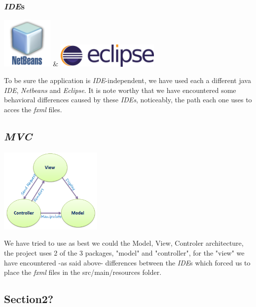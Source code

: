 \documentclass[11pt]{article}
\begin{document}
\subsubsection{\textit{IDE}s}
\begin{center}
\includegraphics[width=2.5cm]{./img/netBeans.png} \& \includegraphics[width=5cm]{./img/eclipse.png}
\end{center}
To be sure the application is \textit{IDE}-independent, we have used each a different java \textit{IDE}, \textit{Netbeans} and \textit{Eclipse}. It is note worthy that we have encountered some behavioral differences caused by these \textit{IDEs}, noticeably, the path each one uses to acces the \textit{fxml} files.
\subsection{\textit{MVC}}
\begin{center}
\includegraphics[width=5cm]{./img/mvc.png}
\end{center}
We have tried to use as best we could the Model, View, Controler architecture, the project uses 2 of the 3 packages, "model" and "controller", for the "view" we have encountered -as said above- differences between the \textit{IDE}s which forced us to place the \textit{fxml} files in the src/main/resources folder.
\subsection{Section2?}
\pagebreak
\end{document}
